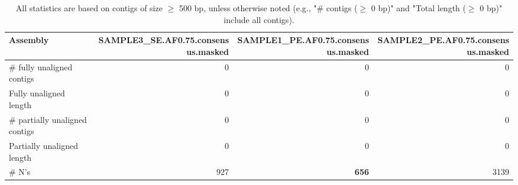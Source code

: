 \documentclass[12pt,a4paper]{article}
\begin{document}
\begin{table}[ht]
\begin{center}
\caption{All statistics are based on contigs of size $\geq$ 500 bp, unless otherwise noted (e.g., "\# contigs ($\geq$ 0 bp)" and "Total length ($\geq$ 0 bp)" include all contigs).}
\begin{tabular}{|l*{3}{|r}|}
\hline
Assembly & SAMPLE3\_SE.AF0.75.consensus.masked & SAMPLE1\_PE.AF0.75.consensus.masked & SAMPLE2\_PE.AF0.75.consensus.masked \\ \hline
\# fully unaligned contigs & 0 & 0 & 0 \\ \hline
Fully unaligned length & 0 & 0 & 0 \\ \hline
\# partially unaligned contigs & 0 & 0 & 0 \\ \hline
Partially unaligned length & 0 & 0 & 0 \\ \hline
\# N's & 927 & {\bf 656} & 3139 \\ \hline
\end{tabular}
\end{center}
\end{table}
\end{document}
